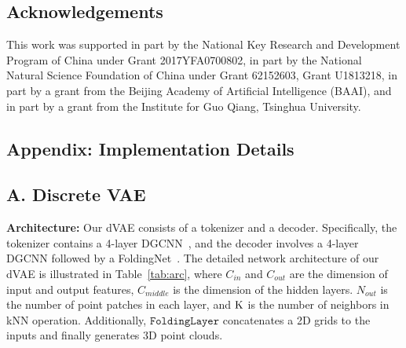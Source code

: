 \documentclass[10pt,twocolumn,letterpaper]{article}
\begin{document}
\subsection*{Acknowledgements}
This work was supported in part by the National Key Research and Development Program of China under Grant 2017YFA0700802, in part by the National Natural Science Foundation of China under Grant 62152603, Grant U1813218, in part by a grant from the Beijing Academy of Artificial Intelligence (BAAI), and in part by a grant from the Institute for Guo Qiang, Tsinghua University.

	{\small
    	\normalem
		
		
	}
	

\newpage
\clearpage
\begin{appendix}
\section*{Appendix: Implementation Details}

\subsection*{A. Discrete VAE}
\noindent \textbf{Architecture:}
Our dVAE consists of a tokenizer and a decoder. Specifically, the tokenizer contains a 4-layer DGCNN~\cite{wang2019dynamic}, and the decoder involves a 4-layer DGCNN followed by a FoldingNet~\cite{foldingnet}. The detailed network architecture of our dVAE  is illustrated in Table~\ref{tab:arc}, where $C_{in}$ and $C_{out}$ are the dimension of input and output features, $C_{middle}$ is the dimension of the hidden layers. $N_{out}$ is the number of point patches in each layer, and  $\textup{K}$  is the number of neighbors in kNN operation. Additionally, $\texttt{FoldingLayer}$ concatenates a 2D grids to the inputs and finally generates 3D point clouds. 


\end{appendix}
\end{document}
